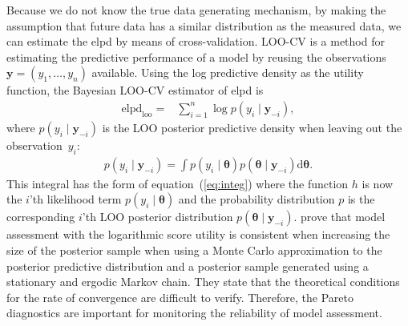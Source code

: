 \documentclass[12pt]{article}
\newenvironment{nalign}{
    \begin{equation}
    \begin{aligned}
}{
    \end{aligned}
    \end{equation}
    \ignorespacesafterend
}
\begin{document}
\begin{appendices}
Because we do not know the true data generating mechanism, by making the assumption
that future data has a similar distribution as the measured data, we
can estimate the elpd by means of cross-validation.
LOO-CV is a method for estimating the predictive performance of a model by 
reusing the observations $\mathbf{y} = ( y_1, \ldots , y_n)$ available.
%
%
Using the log predictive density as the utility function,
the Bayesian LOO-CV estimator of elpd is
\begin{nalign} \label{eq:naive}
\text{elpd}_{\text{loo}} = & \sum_{i = 1}^{n} \log p (y_i \mid \mathbf{y}_{-i}),
%
\end{nalign}
%
where $p (y_i \mid \mathbf{y}_{-i})$ is the LOO posterior predictive density when leaving out the observation~$y_i$:
%
%
%
%
\begin{nalign} \label{eq:loopd}
p (y_i \mid \mathbf{y}_{-i}) = \int p (y_i \mid \boldsymbol{\theta}) p (\boldsymbol{\theta} \mid \mathbf{y}_{-i} ) \text{d} \boldsymbol{\theta} .
\end{nalign}
%
This integral has the form of equation~(\ref{eq:integ}) where the function $h$ is now the $i$'th likelihood term $p (y_i \mid \boldsymbol{\theta})$
and the probability distribution $p$ is
%
the corresponding $i$'th LOO posterior distribution $p (\boldsymbol{\theta} \mid \mathbf{y}_{-i} )$.
%
%
%
%
%
\citet{krueger2016probabilistic} prove that model assessment with the logarithmic score utility
is consistent when increasing the size of the posterior sample when using a Monte Carlo approximation to the posterior predictive distribution and a posterior sample generated using
a stationary and ergodic Markov chain.
They state that the theoretical conditions for the rate of convergence are difficult to verify.
Therefore, the Pareto diagnostics are important for monitoring the reliability of
model assessment.








\end{appendices}
\end{document}

